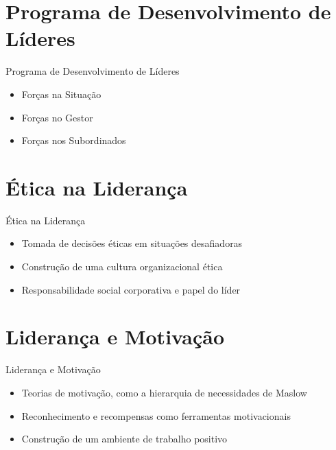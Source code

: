 \documentclass[aspectratio=169,xcolor=dvipsnames]{beamer}
\begin{document}
\section{Programa de Desenvolvimento de Líderes}

\begin{frame}{Programa de Desenvolvimento de Líderes}
	\begin{itemize}
		\item Forças na Situação
		\item Forças no Gestor
		\item Forças nos Subordinados

	\end{itemize}
\end{frame}

\section{Ética na Liderança}

\begin{frame}{Ética na Liderança}
	\begin{itemize}
		\item Tomada de decisões éticas em situações desafiadoras
		\item Construção de uma cultura organizacional ética
		\item Responsabilidade social corporativa e papel do líder

	\end{itemize}
\end{frame}

\section{Liderança e Motivação}

\begin{frame}{Liderança e Motivação}
	\begin{itemize}
		\item Teorias de motivação, como a hierarquia de necessidades de Maslow
		\item Reconhecimento e recompensas como ferramentas motivacionais
		\item Construção de um ambiente de trabalho positivo

	\end{itemize}
\end{frame}
\end{document}
